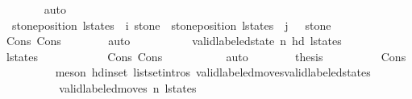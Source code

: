 \begin{isabellebody}
\ \ \ \ \ \ \isamarkupfalse%
\ auto\isanewline
\ \ \ \isamarkupfalse%
\ \isamarkupfalse%
\ {\isacharasterisk}{\isacharcolon}\ {\isachardoublequoteopen}stone{\isacharunderscore}position\ {\isacharparenleft}l{\isacharunderscore}states\ {\isacharbang}\ i{\isacharparenright}\ stone\ {\isasymnoteq}\ stone{\isacharunderscore}position\ {\isacharparenleft}l{\isacharunderscore}states\ {\isacharbang}\ {\isacharparenleft}j\ {\isacharminus}\ {}{\isacharparenright}{\isacharparenright}\ stone{\isachardoublequoteclose}\isanewline
\ \ \ \ \ \ \isamarkupfalse%
\ Cons{\isacharparenleft}{}{\isacharparenright}\ Cons{\isacharparenleft}{}{\isacharparenright}\isanewline
\ \ \ \ \ \ \isamarkupfalse%
\ auto\isanewline
\ \ \ \ \isamarkupfalse%
\isanewline
\ \ \ \ \isamarkupfalse%
\ {\isachardoublequoteopen}valid{\isacharunderscore}labeled{\isacharunderscore}state\ n\ {\isacharparenleft}hd\ l{\isacharunderscore}states{\isacharparenright}{\isachardoublequoteclose}\isanewline
\ \ \ \ \isamarkupfalse%
{\isacharminus}\isanewline
\ \ \ \ \ \ \isamarkupfalse%
\ {\isachardoublequoteopen}l{\isacharunderscore}states\ {\isasymnoteq}\ {\isacharbrackleft}{\isacharbrackright}{\isachardoublequoteclose}\isanewline
\ \ \ \ \ \ \ \ \isamarkupfalse%
\ Cons{\isacharparenleft}{}{\isacharparenright}\ Cons{\isacharparenleft}{}{\isacharparenright}\ {\isacharasterisk}\isanewline
\ \ \ \ \ \ \ \ \isamarkupfalse%
\ auto\isanewline
\ \ \ \ \ \ \isamarkupfalse%
\ {\isacharquery}thesis\isanewline
\ \ \ \ \ \ \ \ \isamarkupfalse%
\ Cons{\isacharparenleft}{}{\isacharminus}{}{\isacharparenright}\isanewline
\ \ \ \ \ \ \ \ \isamarkupfalse%
\ {\isacharparenleft}meson\ hd{\isacharunderscore}in{\isacharunderscore}set\ list{\isachardot}set{\isacharunderscore}intros{\isacharparenleft}{}{\isacharparenright}\ valid{\isacharunderscore}labeled{\isacharunderscore}moves{\isacharunderscore}valid{\isacharunderscore}labeled{\isacharunderscore}states{\isacharparenright}\isanewline
\ \ \ \ \isamarkupfalse%
\isanewline
\isanewline
\ \ \ \ \isamarkupfalse%
\isanewline
\ \ \ \ \isamarkupfalse%
\ {\isachardoublequoteopen}valid{\isacharunderscore}labeled{\isacharunderscore}moves\ n\ l{\isacharunderscore}states{\isachardoublequoteclose}\isanewline
\ \ \ \ \ \ \isamarkupfalse%

\end{isabellebody}
